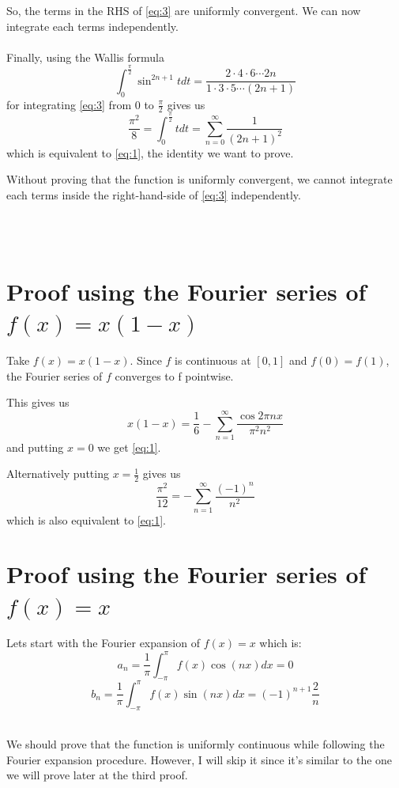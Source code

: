 So, the terms in the RHS of \eqref{eq:3} are uniformly convergent. We can now integrate each terms independently. ~\\\\


Finally, using the Wallis formula
\[
    \int_{0}^\frac{\pi}{2} \sin^{2n+1}t dt =  \frac{2\cdot4\cdot6\cdots2n}{1\cdot3\cdot5\cdots(2n+1)}
\]
for integrating \eqref{eq:3} from $0$ to $\frac{\pi}{2}$ gives us
\[
     \frac{\pi^2}{8} = \int_{0}^\frac{\pi}{2} t dt = \sum_{n=0}^\infty \frac{1}{(2n+1)^2}
\]
which is equivalent to \eqref{eq:1}, the identity we want to prove.~\\


\begin{remark}
Without proving that the function is uniformly convergent, we cannot integrate each terms inside the right-hand-side of \eqref{eq:3} independently.
\end{remark}
~\\\\
\section{Proof using the Fourier series of $f(x)=x(1-x)$~}
Take $f(x)=x(1-x)$. Since $f$ is continuous at $[0,1]$ and $f(0)=f(1)$, the Fourier series of $f$ converges to f pointwise.



This gives us
\[
    x(1-x)=\frac{1}{6}-\sum_{n=1}^{\infty}\frac{\cos 2\pi nx}{\pi^2n^2}
\]
and putting $x=0$ we get \eqref{eq:1}.

Alternatively putting $x=\frac{1}{2}$ gives us
\[
    \frac{\pi^2}{12}=-\sum_{n=1}^{\infty}\frac{(-1)^n}{n^2}
\]
which is also equivalent to \eqref{eq:1}.

\newpage
\section{Proof using the Fourier series of $f(x)=x$~}
Lets start with the Fourier expansion of $f(x) = x$ which is:
\[
    a_n =  \frac{1}{\pi}\int_{-\pi}^{\pi}f(x)\cos(nx)dx = 0
\]
\[
    b_n =  \frac{1}{\pi}\int_{-\pi}^{\pi}f(x)\sin(nx)dx = (-1)^{n+1}\frac{2}{n}
\]
~\\
\begin{remark}
    We should prove that the function is uniformly continuous while following the Fourier expansion procedure. However, I will skip it since it's similar to the one we will prove later at the third proof.
\end{remark}
~\\



